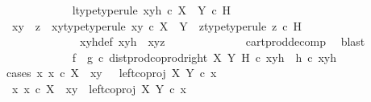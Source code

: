 \begin{isabellebody}
\ \ \ \ \ \ \ \ \ \ \isamarkupfalse%
\ l{\isacharunderscore}{\kern0pt}type{\isacharbrackleft}{\kern0pt}type{\isacharunderscore}{\kern0pt}rule{\isacharbrackright}{\kern0pt}{\isacharcolon}{\kern0pt}\ {\isachardoublequoteopen}xyh\ {\isasymin}\isactrlsub c\ {\isacharparenleft}{\kern0pt}X\ {\isasymCoprod}\ Y{\isacharparenright}{\kern0pt}\ {\isasymtimes}\isactrlsub c\ H{\isachardoublequoteclose}\isanewline
\ \ \ \ \ \ \ \ \ \ \isamarkupfalse%
\ \isamarkupfalse%
\ xy\ \ z\ \ xy{\isacharunderscore}{\kern0pt}type{\isacharbrackleft}{\kern0pt}type{\isacharunderscore}{\kern0pt}rule{\isacharbrackright}{\kern0pt}{\isacharcolon}{\kern0pt}\ {\isachardoublequoteopen}xy\ {\isasymin}\isactrlsub c\ X\ {\isasymCoprod}\ Y{\isachardoublequoteclose}\ \ z{\isacharunderscore}{\kern0pt}type{\isacharbrackleft}{\kern0pt}type{\isacharunderscore}{\kern0pt}rule{\isacharbrackright}{\kern0pt}{\isacharcolon}{\kern0pt}\ {\isachardoublequoteopen}z\ {\isasymin}\isactrlsub c\ H{\isachardoublequoteclose}\isanewline
\ \ \ \ \ \ \ \ \ \ \ \ \ xyh{\isacharunderscore}{\kern0pt}def{\isacharcolon}{\kern0pt}\ {\isachardoublequoteopen}xyh\ {\isacharequal}{\kern0pt}\ {\isasymlangle}xy{\isacharcomma}{\kern0pt}z{\isasymrangle}{\isachardoublequoteclose}\isanewline
\ \ \ \ \ \ \ \ \ \ \ \ \isamarkupfalse%
\ cart{\isacharunderscore}{\kern0pt}prod{\isacharunderscore}{\kern0pt}decomp\ \isamarkupfalse%
\ blast\isanewline
\ \ \ \ \ \ \ \ \ \ \isamarkupfalse%
\ {\isachardoublequoteopen}{\isacharparenleft}{\kern0pt}f\isactrlsup {\isasymflat}\ {\isasymamalg}\ g\isactrlsup {\isasymflat}\ {\isasymcirc}\isactrlsub c\ dist{\isacharunderscore}{\kern0pt}prod{\isacharunderscore}{\kern0pt}coprod{\isacharunderscore}{\kern0pt}right\ X\ Y\ H{\isacharparenright}{\kern0pt}\ {\isasymcirc}\isactrlsub c\ xyh\ {\isacharequal}{\kern0pt}\ h\isactrlsup {\isasymflat}\ {\isasymcirc}\isactrlsub c\ xyh{\isachardoublequoteclose}\isanewline
\ \ \ \ \ \ \ \ \ \ \isamarkupfalse%
{\isacharparenleft}{\kern0pt}cases\ {\isachardoublequoteopen}{\isasymexists}x{\isachardot}{\kern0pt}\ x\ {\isasymin}\isactrlsub c\ X\ {\isasymand}\ xy\ {\isacharequal}{\kern0pt}\ \ left{\isacharunderscore}{\kern0pt}coproj\ X\ Y\ {\isasymcirc}\isactrlsub c\ x{\isachardoublequoteclose}{\isacharparenright}{\kern0pt}\isanewline
\ \ \ \ \ \ \ \ \ \ \ \ \isamarkupfalse%
\ {\isachardoublequoteopen}{\isasymexists}x{\isachardot}{\kern0pt}\ x\ {\isasymin}\isactrlsub c\ X\ {\isasymand}\ xy\ {\isacharequal}{\kern0pt}\ left{\isacharunderscore}{\kern0pt}coproj\ X\ Y\ {\isasymcirc}\isactrlsub c\ x{\isachardoublequoteclose}\isanewline

\end{isabellebody}
